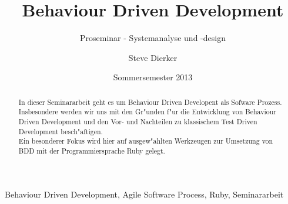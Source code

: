 \documentclass[runningheads,a4paper]{llncs}
\newcommand{\keywords}[1]{\par\addvspace\baselineskip
\noindent\keywordname\enspace\ignorespaces#1}
\begin{document}
\mainmatter

\title{Behaviour Driven Development}
\subtitle{Proseminar - Systemanalyse und -design}
\date{Sommersemester 2013}

\author{Steve Dierker}


\maketitle

\begin{abstract}
  In dieser Seminararbeit geht es um Behaviour Driven Developent als Sofware 
  Prozess. Insbesondere werden wir uns mit den Gr"unden f"ur die Entwicklung von
  Behaviour Driven Development und den Vor- und Nachteilen zu klassischem Test 
  Driven Development besch"aftigen.\\
  Ein besonderer Fokus wird hier auf ausgew"ahlten Werkzeugen zur Umsetzung von 
  BDD mit der Programmiersprache Ruby gelegt.


\end{abstract}

\keywords{Behaviour Driven Development, Agile Software Process, Ruby, Seminararbeit}
\end{document}
